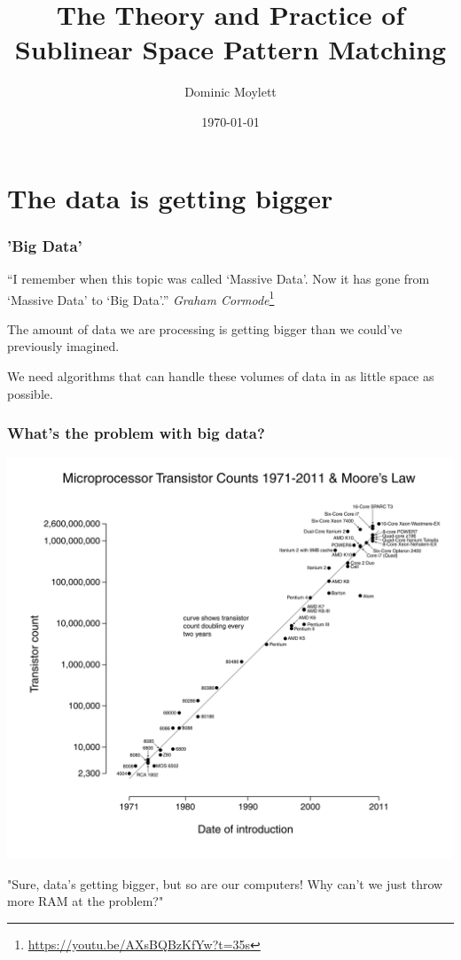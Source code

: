 \documentclass{beamer}
\title[Sublinear Space Pattern Matching]{The Theory and Practice of Sublinear Space Pattern Matching} %
\author{Dominic Moylett} %
\institute[University of Bristol] %
{
University of Bristol \\ %
\medskip
\textit{dominic.moylett.2011@my.bristol.ac.uk} %
}
\date{\today} %
\begin{document}
\begin{frame}
\titlepage %
\end{frame}


\section{The data is getting bigger}

\begin{frame}
\frametitle{'Big Data'}
``I remember when this topic was called `Massive Data'. Now it has gone from `Massive Data' to `Big Data'.''
\textit{Graham Cormode}\footnote{\url{https://youtu.be/AXsBQBzKfYw?t=35s}}

The amount of data we are processing is getting bigger than we could've previously imagined.

We need algorithms that can handle these volumes of data in as little space as possible.
\end{frame}


\begin{frame}
\frametitle{What's the problem with big data?}
\begin{center}
\includegraphics[width=0.5\paperwidth]{moores_law}
\end{center}
"Sure, data's getting bigger, but so are our computers! Why can't we just throw more RAM at the problem?"
\end{frame}
\end{document}

